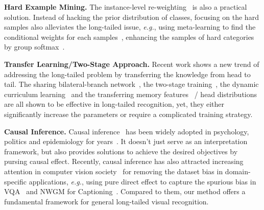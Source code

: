 \documentclass{article}
\newcommand{\eg}{\textit{e.g.}}
\begin{document}
\textbf{Hard Example Mining.} The instance-level re-weighting~\cite{lin2017focal, shu2019meta, ren2018learning} is also a practical solution. Instead of hacking the prior distribution of classes, focusing on the hard samples also alleviates the long-tailed issue, \eg, using meta-learning to find the conditional weights for each samples~\cite{jamal2020rethinking}, enhancing the samples of hard categories by group softmax~\cite{li2020overcoming}.

\textbf{Transfer Learning/Two-Stage Approach.} Recent work shows a new trend of addressing the long-tailed problem by transferring the knowledge from head to tail. The sharing bilateral-branch network~\cite{zhou2019bbn}, the two-stage training~\cite{kang2019decoupling}, the dynamic curriculum learning~\cite{wang2019dynamic} and the transferring memory features~\cite{liu2019large} / head distributions~\cite{liu2020deep} are all shown to be effective in long-tailed recognition, yet, they either significantly increase the parameters or require a complicated training strategy.

\textbf{Causal Inference.} Causal inference~\cite{pearl2016causal, Judea2018thebookofwhy} has been widely adopted in psychology, politics and epidemiology for years~\cite{mackinnon2007mediation, keele2015statistics, richiardi2013mediation}. It doesn't just serve as an interpretation framework, but also provides solutions to achieve the desired objectives by pursing causal effect. Recently, causal inference has also attracted increasing attention in computer vision society~\cite{tang2020unbiased, qi2019two, niu2020counterfactual, yang2020deconfounded, zhang2020causal, yue2020interventional} for removing the dataset bias in domain-specific applications, \eg, using pure direct effect to capture the spurious bias in VQA~\cite{niu2020counterfactual} and NWGM for Captioning~\cite{yang2020deconfounded}. Compared to them, our method offers a fundamental framework for general long-tailed visual recognition.
\end{document}
